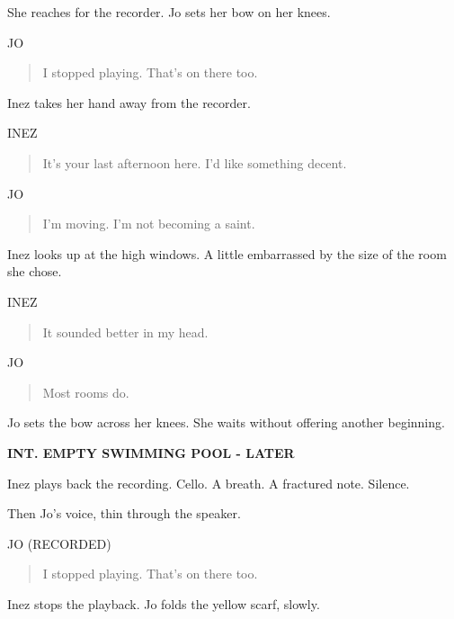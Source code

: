 \documentclass[12pt,letterpaper]{article}
\newcommand{\scene}[1]{\needspace{5\baselineskip}\vspace{8pt}\textbf{#1}\par}
\newcommand{\character}[1]{\needspace{4\baselineskip}\hspace*{2.2in}#1\par\nopagebreak}
\begin{document}
She reaches for the recorder. Jo sets her bow on her knees.\par

\character{JO}
\begin{quote}I stopped playing. That's on there too.\par\end{quote}

Inez takes her hand away from the recorder.\par

\character{INEZ}
\begin{quote}It's your last afternoon here. I'd like something decent.\par\end{quote}

\character{JO}
\begin{quote}I'm moving. I'm not becoming a saint.\par\end{quote}

Inez looks up at the high windows. A little embarrassed by the size of the room she chose.\par

\character{INEZ}
\begin{quote}It sounded better in my head.\par\end{quote}

\character{JO}
\begin{quote}Most rooms do.\par\end{quote}

Jo sets the bow across her knees. She waits without offering another beginning.\par

\scene{INT. EMPTY SWIMMING POOL - LATER}

Inez plays back the recording. Cello. A breath. A fractured note. Silence.\par

Then Jo's voice, thin through the speaker.\par

\character{JO (RECORDED)}
\begin{quote}I stopped playing. That's on there too.\par\end{quote}

Inez stops the playback. Jo folds the yellow scarf, slowly.\par
\end{document}
